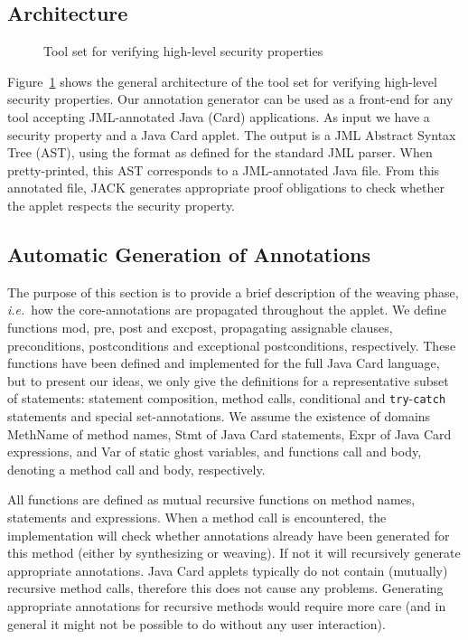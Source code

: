 \subsection{Architecture}

\begin{figure}[pht]
\begin{center}
\end{center}
\caption{\sc Tool set for verifying high-level security properties}\label{FigArch}
\end{figure}



Figure~\ref{FigArch} shows the general architecture of the tool set
for verifying high-level security properties. Our annotation generator
can be used as a front-end for any tool accepting JML-annotated Java
(Card) applications. As input we have a security property and a Java
Card applet. The output is a JML Abstract Syntax Tree (AST), using the
format as defined for the standard JML parser. When pretty-printed,
this AST corresponds to a JML-annotated Java file. From this
annotated file, JACK generates appropriate proof obligations to check
whether the applet respects the security property.

\subsection{Automatic Generation of Annotations}
The purpose of this section is to provide a brief description of the
weaving phase, \emph{i.e.}~how the core-annotations are propagated
throughout the applet. We define functions \textsf{mod}, \textsf{pre},
\textsf{post} and \textsf{exc\-post}, propagating assignable clauses,
preconditions, postconditions and exceptional postconditions,
respectively. These functions have been defined and implemented for
the full Java Card language, but to present our ideas, we only give
the definitions for a representative subset of statements: statement
composition, method calls, conditional and \texttt{try}-\texttt{catch}
statements and special set-annotations. We assume the existence of
domains \textsf{MethName} of method names, \textsf{Stmt} of Java Card
statements, \textsf{Expr} of Java Card expressions, and \textsf{Var}
of static ghost variables, and functions \textsf{call} and
\textsf{body}, denoting a method call and body, respectively.

All functions are defined as mutual recursive functions on method
names, statements and expressions. When a method call is encountered,
the implementation will check whether annotations already have been
generated for this method (either by synthesizing or weaving). If not
it will recursively generate appropriate annotations. Java Card
applets typically do not contain (mutually) recursive method calls,
therefore this does not cause any problems. Generating appropriate
annotations for recursive methods would require more care (and in
general it might not be possible to do without any user interaction).



